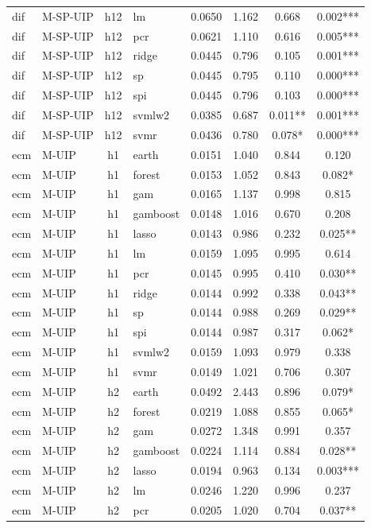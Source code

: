 \begin{ThreePartTable}
\begin{longtable}[t]{llclcccc}
dif & M-SP-UIP & h12 & lm & 0.0650 & 1.162 & 0.668 & 0.002***\\
dif & M-SP-UIP & h12 & pcr & 0.0621 & 1.110 & 0.616 & 0.005***\\
dif & M-SP-UIP & h12 & ridge & 0.0445 & 0.796 & 0.105 & 0.001***\\
dif & M-SP-UIP & h12 & sp & 0.0445 & 0.795 & 0.110 & 0.000***\\
dif & M-SP-UIP & h12 & spi & 0.0445 & 0.796 & 0.103 & 0.000***\\
dif & M-SP-UIP & h12 & svmlw2 & 0.0385 & 0.687 & 0.011** & 0.001***\\
dif & M-SP-UIP & h12 & svmr & 0.0436 & 0.780 & 0.078* & 0.000***\\
\addlinespace
ecm & M-UIP & h1 & earth & 0.0151 & 1.040 & 0.844 & 0.120\\
ecm & M-UIP & h1 & forest & 0.0153 & 1.052 & 0.843 & 0.082*\\
ecm & M-UIP & h1 & gam & 0.0165 & 1.137 & 0.998 & 0.815\\
ecm & M-UIP & h1 & gamboost & 0.0148 & 1.016 & 0.670 & 0.208\\
ecm & M-UIP & h1 & lasso & 0.0143 & 0.986 & 0.232 & 0.025**\\
ecm & M-UIP & h1 & lm & 0.0159 & 1.095 & 0.995 & 0.614\\
ecm & M-UIP & h1 & pcr & 0.0145 & 0.995 & 0.410 & 0.030**\\
ecm & M-UIP & h1 & ridge & 0.0144 & 0.992 & 0.338 & 0.043**\\
ecm & M-UIP & h1 & sp & 0.0144 & 0.988 & 0.269 & 0.029**\\
ecm & M-UIP & h1 & spi & 0.0144 & 0.987 & 0.317 & 0.062*\\
ecm & M-UIP & h1 & svmlw2 & 0.0159 & 1.093 & 0.979 & 0.338\\
ecm & M-UIP & h1 & svmr & 0.0149 & 1.021 & 0.706 & 0.307\\
\addlinespace
ecm & M-UIP & h2 & earth & 0.0492 & 2.443 & 0.896 & 0.079*\\
ecm & M-UIP & h2 & forest & 0.0219 & 1.088 & 0.855 & 0.065*\\
ecm & M-UIP & h2 & gam & 0.0272 & 1.348 & 0.991 & 0.357\\
ecm & M-UIP & h2 & gamboost & 0.0224 & 1.114 & 0.884 & 0.028**\\
ecm & M-UIP & h2 & lasso & 0.0194 & 0.963 & 0.134 & 0.003***\\
ecm & M-UIP & h2 & lm & 0.0246 & 1.220 & 0.996 & 0.237\\
ecm & M-UIP & h2 & pcr & 0.0205 & 1.020 & 0.704 & 0.037**\\

\end{longtable}
\end{ThreePartTable}
